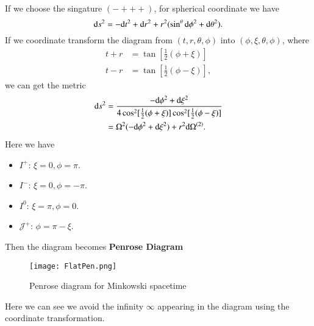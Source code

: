 \documentclass[openany,10pt]{book}
\theoremstyle{definition}
\theoremstyle{definition}
\theoremstyle{remark}
\begin{document}
If we choose the singature $(-+++)$, for spherical coordinate we have 
\begin{equation}
    {\rm{d}}s^2=-{\rm{d}}t^2+{\rm{d}}r^2+r^2(\sin^\theta{\rm{d}}\phi^2+{\rm{d}}\theta^2).
\end{equation}
If we coordinate transform the diagram from $(t,r,\theta,\phi)$ into $(\phi,\xi,\theta,\phi)$, where 
\begin{equation}
    \begin{aligned}
        t+r&=\tan[\frac{1}{2}(\phi+\xi)]\\
        t-r&=\tan[\frac{1}{2}(\phi-\xi)],
    \end{aligned}
\end{equation}
we can get the metric 
\begin{equation}
    \begin{aligned}
        {\rm{d}}s^2&=\frac{-{\rm{d}}\phi^2+{\rm{d}}\xi^2}{4\cos^2[\frac{1}{2}(\phi+\xi)]\cos^2[\frac{1}{2}(\phi-\xi)]}\\
        &=\Omega^2(-{\rm{d}}\phi^2+{\rm{d}}\xi^2)+r^2{\rm{d}}\Omega^{(2)}.
    \end{aligned}
\end{equation}
Here we have 
\begin{itemize}
    \item {$I^+$: $\xi=0,\phi=\pi$.}
    \item {$I^-$: $\xi=0,\phi=-\pi$.}
    \item {$I^0$: $\xi=\pi,\phi=0$.}
    \item {$\mathcal{J}^+$: $\phi=\pi-\xi$.}
\end{itemize}
Then the diagram becomes \textbf{Penrose Diagram}
\begin{figure}[H]
    \centering
    \texttt{[image: FlatPen.png]}
    \caption{Penrose diagram for Minkowski spacetime}
    \label{flatpen}
\end{figure}

Here we can see we avoid the infinity $\infty$ appearing in the diagram using the coordinate transformation.
\end{document}

